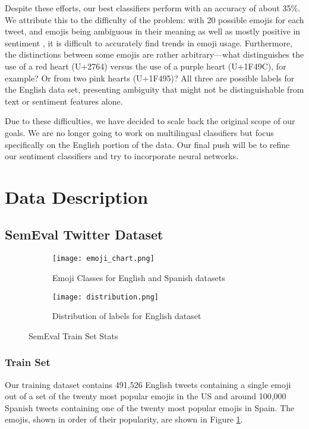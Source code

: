 \documentclass[10pt]{article}
\begin{document}
Despite these efforts, our best classifiers perform with an accuracy of about 35\%. We attribute this to the difficulty of the problem: with 20 possible emojis for each tweet, and emojis being ambiguous in their meaning \cite{miller2016blissfully} as well as mostly positive in sentiment \cite{novak2015sentiment}, it is difficult to accurately find trends in emoji usage. Furthermore, the distinctions between some emojis are rather arbitrary—what distinguishes the use of a red heart (U+2764) versus the use of a purple heart (U+1F49C), for example? Or from two pink hearts (U+1F495)? All three are possible labels for the English data set, presenting ambiguity that might not be distinguishable from text or sentiment features alone.

Due to these difficulties, we have decided to scale back the original scope of our goals. We are no longer going to work on multilingual classifiers but focus specifically on the English portion of the data. Our final push will be to refine our sentiment classifiers and try to incorporate neural networks.


\section{Data Description}
\subsection{SemEval Twitter Dataset}
\begin{figure}
\centering
\begin{subfigure}{.5\textwidth}
  \centering
  \texttt{[image: emoji\_chart.png]}
  \caption{Emoji Classes for English and Spanish datasets}
  \label{fig:emojis}
\end{subfigure}%
\begin{subfigure}{.5\textwidth}
  \centering
  \texttt{[image: distribution.png]}
  \caption{Distribution of labels for English dataset}
  \label{fig:distribution}
\end{subfigure}
\caption{SemEval Train Set Stats}
\label{fig:semevaltrain}
\end{figure}
\subsubsection{Train Set}
Our training dataset contains 491,526 English tweets containing a single emoji out of a set of the twenty most popular emojis in the US and around 100,000 Spanish tweets containing one of the twenty most popular emojis in Spain. The emojis, shown in order of their popularity, are shown in Figure \ref{fig:emojis}.
\end{document}
